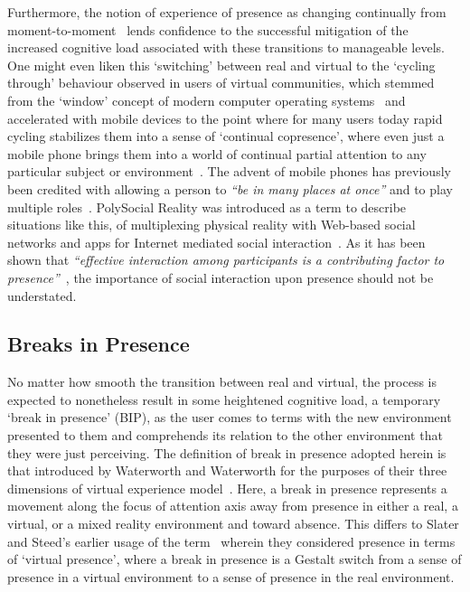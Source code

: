 Furthermore, the notion of experience of presence as changing continually from moment-to-moment~\cite{Heeter2003, Ijsselsteijn1998} lends confidence to the successful mitigation of the increased cognitive load associated with these transitions to manageable levels. One might even liken this `switching' between real and virtual to the `cycling through' behaviour observed in users of virtual communities, which stemmed from the `window' concept of modern computer operating systems~\cite{Turkle2004} and accelerated with mobile devices to the point where for many users today rapid cycling stabilizes them into a sense of `continual copresence', where even just a mobile phone brings them into a world of continual partial attention to any particular subject or environment~\cite{Turkle2011}. The advent of mobile phones has previously been credited with allowing a person to \textit{``be in many places at once''} and to play multiple roles~\cite{Terashima2001}. PolySocial Reality was introduced as a term to describe situations like this, of multiplexing physical reality with Web-based social networks and apps for Internet mediated social interaction~\cite{Applin2012}. As it has been shown that \textit{``effective interaction among participants is a contributing factor to presence''}~\cite{Terashima2001}, the importance of social interaction upon presence should not be understated.



\subsection{Breaks in Presence}

\label{background-breaks-in-presence}

No matter how smooth the transition between real and virtual, the process is expected to nonetheless result in some heightened cognitive load, a temporary `break in presence' (BIP), as the user comes to terms with the new environment presented to them and comprehends its relation to the other environment that they were just perceiving. The definition of break in presence adopted herein is that introduced by Waterworth and Waterworth for the purposes of their three dimensions of virtual experience model~\cite{Waterworth2001}. Here, a break in presence represents a movement along the focus of attention axis away from presence in either a real, a virtual, or a mixed reality environment and toward absence. This differs to Slater and Steed's earlier usage of the term~\cite{Slater2000} wherein they considered presence in terms of `virtual presence', where a break in presence is a Gestalt switch from a sense of presence in a virtual environment to a sense of presence in the real environment.

